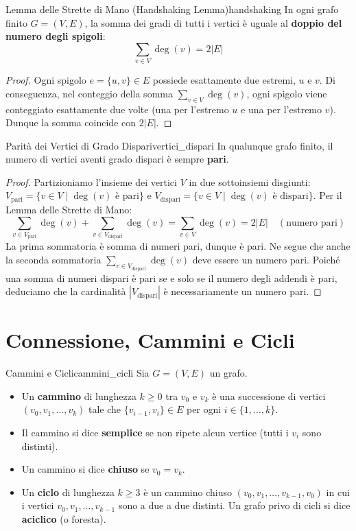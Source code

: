 \begin{teorema}{Lemma delle Strette di Mano (Handshaking Lemma)}{handshaking}
In ogni grafo finito $G = (V, E)$, la somma dei gradi di tutti i vertici è uguale al \textbf{doppio del numero degli spigoli}:
\[
    \sum_{v \in V} \deg(v) = 2 |E|
\]
\end{teorema}
\begin{proof}
Ogni spigolo $e = \{u, v\} \in E$ possiede esattamente due estremi, $u$ e $v$. Di conseguenza, nel conteggio della somma $\sum_{v \in V} \deg(v)$, ogni spigolo viene conteggiato esattamente due volte (una per l'estremo $u$ e una per l'estremo $v$). Dunque la somma coincide con $2|E|$.
\end{proof}

\begin{proposizione}{Parità dei Vertici di Grado Dispari}{vertici_dispari}
In qualunque grafo finito, il numero di vertici aventi grado dispari è sempre \textbf{pari}.
\end{proposizione}
\begin{proof}
Partizioniamo l'insieme dei vertici $V$ in due sottoinsiemi disgiunti: $V_{\text{pari}} = \{v \in V \mid \deg(v) \text{ è pari}\}$ e $V_{\text{dispari}} = \{v \in V \mid \deg(v) \text{ è dispari}\}$.
Per il Lemma delle Strette di Mano:
\[
    \sum_{v \in V_{\text{pari}}} \deg(v) + \sum_{v \in V_{\text{dispari}}} \deg(v) = \sum_{v \in V} \deg(v) = 2|E| \quad (\text{numero pari})
\]
La prima sommatoria è somma di numeri pari, dunque è pari. Ne segue che anche la seconda sommatoria $\sum_{v \in V_{\text{dispari}}} \deg(v)$ deve essere un numero pari.
Poiché una somma di numeri dispari è pari se e solo se il numero degli addendi è pari, deduciamo che la cardinalità $|V_{\text{dispari}}|$ è necessariamente un numero pari.
\end{proof}

\section{Connessione, Cammini e Cicli}

\begin{definizione}{Cammini e Cicli}{cammini_cicli}
Sia $G = (V, E)$ un grafo.
\begin{itemize}
    \item Un \textbf{cammino} di lunghezza $k \ge 0$ tra $v_0$ e $v_k$ è una successione di vertici $(v_0, v_1, \dots, v_k)$ tale che $\{v_{i-1}, v_i\} \in E$ per ogni $i \in \{1, \dots, k\}$.
    \item Il cammino si dice \textbf{semplice} se non ripete alcun vertice (tutti i $v_i$ sono distinti).
    \item Un cammino si dice \textbf{chiuso} se $v_0 = v_k$.
    \item Un \textbf{ciclo} di lunghezza $k \ge 3$ è un cammino chiuso $(v_0, v_1, \dots, v_{k-1}, v_0)$ in cui i vertici $v_0, v_1, \dots, v_{k-1}$ sono a due a due distinti.
    Un grafo privo di cicli si dice \textbf{aciclico} (o foresta).
\end{itemize}
\end{definizione}

